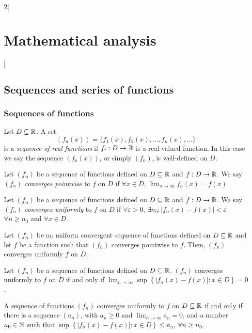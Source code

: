 \documentclass[../../../main_math.tex]{subfiles}
\begin{document}
\begin{multicols}{2}[\section{Mathematical analysis}]
  \subsection{Sequences and series of functions}
  \subsubsection{Sequences of functions}
  \begin{definition}
    Let $D\subseteq\mathbb{R} $. A set $$(f_n(x))=\{f_1(x),f_2(x),\ldots,f_n(x),\ldots\}$$ is a \emph{sequence of real functions} if $f_i:D\rightarrow\mathbb{R} $ is a real-valued function. In this case we say the sequence $(f_n(x))$, or simply $(f_n)$, is well-defined on $D$.
  \end{definition}
  \begin{definition}
    Let $(f_n)$ be a sequence of functions defined on $D\subseteq\mathbb{R} $ and $f:D\rightarrow\mathbb{R} $. We say $(f_n)$ \emph{converges pointwise} to $f$ on $D$ if $\forall x\in D$, $\displaystyle\lim_{n\to\infty}f_n(x)=f(x)$
  \end{definition}
  \begin{definition}
    Let $(f_n)$ be a sequence of functions defined on $D\subseteq\mathbb{R} $ and $f:D\rightarrow\mathbb{R} $. We say $(f_n)$ \emph{converges uniformly} to $f$ on $D$ if $\forall\varepsilon>0$, $\exists n_0:|f_n(x)-f(x)|<\varepsilon$ $\forall n\geq n_0$ and $\forall x\in D$.
  \end{definition}
  \begin{lemma}
    Let $(f_n)$ be an uniform convergent sequence of functions defined on $D\subseteq\mathbb{R} $ and let $f$ be a function such that $(f_n)$ converges pointwise to $f$. Then, $(f_n)$ converges uniformly $f$ on $D$.
  \end{lemma}
  \begin{lemma}\label{MA:sup-equivalence}
    Let $(f_n)$ be a sequence of functions defined on $D\subseteq\mathbb{R} $. $(f_n)$ converges uniformly to $f$ on $D$ if and only if $\displaystyle \lim_{n\to\infty}\sup\left\{|f_n(x)-f(x)|:x\in D\right\}=0$.
  \end{lemma}
  \begin{corollary}
    A sequence of functions $(f_n)$ converges uniformly to $f$ on $D\subseteq\mathbb{R} $ if and only if there is a sequence $(a_n)$, with $a_n\geq 0$ and $\displaystyle \lim_{n\to\infty} a_n=0$, and a number $\displaystyle n_0\in\mathbb{N} $ such that $\sup\left\{|f_n(x)-f(x)|: x\in D\right\}\leq a_n$, $\forall n\geq n_0$.
  \end{corollary}

\end{multicols}
\end{document}

